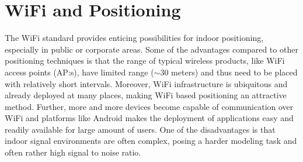 \documentclass{LTHthesis}
\begin{document}
\section{WiFi and Positioning}
\label{sec:wifi_positioning}
%
The WiFi standard provides enticing possibilities for indoor positioning, especially in public or corporate areas. Some of the advantages compared to other positioning techniques is that the range of typical wireless products, like WiFi access points (AP:s), have limited range ($\sim 30$ meters) and thus need to be placed with relatively short intervals. Moreover, WiFi infrastructure is ubiquitous and already deployed at many places, making WiFi based positioning an attractive method. Further, more and more devices become capable of communication over WiFi and platforms like Android makes the deployment of applications easy and readily available for large amount of users. One of the disadvantages is that indoor signal environments are often complex, posing a harder modeling task and often rather high signal to noise ratio.
\end{document}
